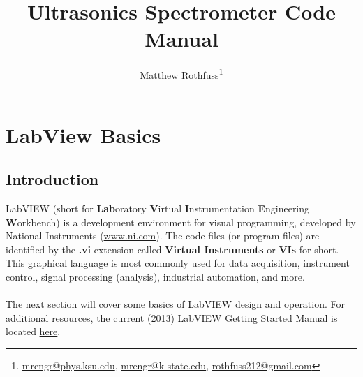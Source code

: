 \documentclass[letterpaper, twoside, openright]{report}
\begin{document}
\title{Ultrasonics Spectrometer Code Manual}
\author{Matthew Rothfuss\thanks{\href{mailto:mrengr@phys.ksu.edu}{mrengr@phys.ksu.edu}, \href{mailto:mrengr@k-state.edu}{mrengr@k-state.edu}, \href{mailto:rothfuss212@gmail.com}{rothfuss212@gmail.com}}}

\maketitle




\tableofcontents


\chapter{LabView Basics}

\section{Introduction}

LabVIEW	(short	for	\textbf{Lab}oratory	\textbf{V}irtual	\textbf{I}nstrumentation	\textbf{E}ngineering	\textbf{W}orkbench) is a development environment for visual programming, developed by National Instruments (\href{http://www.ni.com/}{www.ni.com}). The code files (or program files) are identified by the \textbf{.vi} extension called \textbf{Virtual Instruments} or \textbf{VIs} for short. This graphical language is most commonly used for data acquisition, instrument control, signal processing (analysis), industrial automation, and more.
\\ \\
The next section will cover some basics of LabVIEW design and operation. For additional resources, the current (2013) LabVIEW Getting Started Manual is located \href{http://www.ni.com/pdf/manuals/373427j.pdf}{here}.
\end{document}
